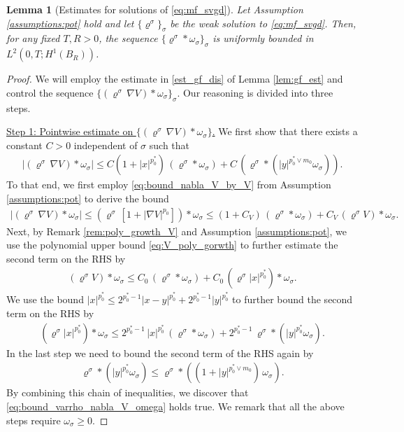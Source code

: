 \documentclass[reqno, 11pt]{amsart}
\numberwithin{equation}{section}
\newtheorem{lem}[thm]{Lemma}
\theoremstyle{definition}
\begin{document}
\begin{lem}[Estimates for solutions of \eqref{eq:mf_svgd}]\label{prop:bounds_gradient}
    Let Assumption \ref{assumptions:pot} hold and let $\{\varrho^\sigma\}_\sigma$ be the weak solution to \eqref{eq:mf_svgd}. Then, for any fixed $T,R>0$, the sequence $\{\varrho^\sigma\ast \omega_\sigma\}_\sigma$ is uniformly bounded in $L^2(0,T; H^1(B_R))$.
\end{lem}
\begin{proof}
    We will employ the estimate in \ref{est_gf_dis} of Lemma \ref{lem:gf_est} and control the sequence $\{(\varrho^\sigma\, \nabla V) \ast \omega_\sigma\}_\sigma$. Our reasoning is divided into three steps.
    
    \smallskip
    
    \underline{Step 1: Pointwise estimate on $\{(\varrho^\sigma\, \nabla V) \ast \omega_\sigma\}$.}
    We first show that there exists a constant $C>0$ independent of $\sigma$ such that
    \begin{align}
        |(\varrho^\sigma\, \nabla V) \ast \omega_\sigma|
        \leq C(1+|x|^{p_0^\ast})\,(\varrho^\sigma\ast\omega_\sigma)+C\, (\varrho^\sigma\ast(|y|^{p_0^\ast\vee m_0}\omega_\sigma)). \label{eq:bound_varrho_nabla_V_omega}
    \end{align}
    To that end, we first employ \eqref{eq:bound_nabla_V_by_V} from Assumption \ref{assumptions:pot} to derive the bound
    \begin{align*}
        |(\varrho^\sigma\, \nabla V) \ast \omega_\sigma|
        \leq (\varrho^\sigma\, [1+|\nabla V|^{p_0}]) \ast \omega_\sigma
        \leq (1+C_V)\,(\varrho^\sigma \ast \omega_\sigma)
        +C_V\,(\varrho^\sigma  V)\ast \omega_\sigma.
    \end{align*}
    Next, by Remark \ref{rem:poly_growth_V} and Assumption \ref{assumptions:pot}, we use the polynomial upper bound \eqref{eq:V_poly_gorwth} to further estimate the second term on the RHS by
    \begin{align*}
        (\varrho^\sigma  V)\ast \omega_\sigma
        \leq C_0\,(\varrho^\sigma\ast \omega_\sigma)
        +C_0\, (\varrho^\sigma |x|^{p_0^\ast})\ast \omega_\sigma.
    \end{align*}
    We use the bound $|x|^{p_0^\ast}\leq 2^{p_0^\ast-1}|x-y|^{p_0^\ast}+2^{p_0^\ast-1}|y|^{p_0^\ast}$ to further bound the second term on the RHS by
    \begin{align*}
        (\varrho^\sigma |x|^{p_0^\ast})\ast \omega_\sigma
        \leq 2^{p_0^\ast-1}\,|x|^{p_0^\ast}\,(\varrho^\sigma \ast \omega_\sigma)+2^{p_0^\ast-1}\,\varrho^\sigma\ast (|y|^{p_0^\ast}\omega_\sigma).
    \end{align*}
    In the last step we need to bound the second term of the RHS again by
    \begin{align*}
        \varrho^\sigma\ast (|y|^{p_0^\ast}\omega_\sigma)
        \leq \varrho^\sigma\ast ((1+|y|^{p_0^\ast\vee m_0})\,\omega_\sigma).
    \end{align*}
    By combining this chain of inequalities, we discover that \eqref{eq:bound_varrho_nabla_V_omega} holds true. We remark that all the above steps require $\omega_{\sigma}\geq 0$.
    \smallskip
    

\end{proof}
\end{document}
